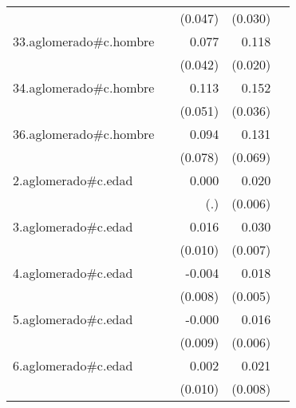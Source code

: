 {\begin{longtable}{l*{4}{D{.}{.}{-1}}}
            &                     &     (0.047)         &     (0.030)         &                     \\
\addlinespace
33.aglomerado#c.hombre&                     &       0.077         &       0.118\sym{***}&                     \\
            &                     &     (0.042)         &     (0.020)         &                     \\
\addlinespace
34.aglomerado#c.hombre&                     &       0.113\sym{*}  &       0.152\sym{***}&                     \\
            &                     &     (0.051)         &     (0.036)         &                     \\
\addlinespace
36.aglomerado#c.hombre&                     &       0.094         &       0.131         &                     \\
            &                     &     (0.078)         &     (0.069)         &                     \\
\addlinespace
2.aglomerado#c.edad&                     &       0.000         &       0.020\sym{***}&                     \\
            &                     &         (.)         &     (0.006)         &                     \\
\addlinespace
3.aglomerado#c.edad&                     &       0.016         &       0.030\sym{***}&                     \\
            &                     &     (0.010)         &     (0.007)         &                     \\
\addlinespace
4.aglomerado#c.edad&                     &      -0.004         &       0.018\sym{***}&                     \\
            &                     &     (0.008)         &     (0.005)         &                     \\
\addlinespace
5.aglomerado#c.edad&                     &      -0.000         &       0.016\sym{**} &                     \\
            &                     &     (0.009)         &     (0.006)         &                     \\
\addlinespace
6.aglomerado#c.edad&                     &       0.002         &       0.021\sym{**} &                     \\
            &                     &     (0.010)         &     (0.008)         &                     \\

\end{longtable}}
